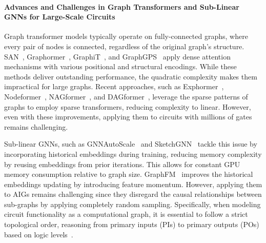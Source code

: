 \paragraph{Advances and Challenges in Graph Transformers and Sub-Linear GNNs for Large-Scale Circuits}
Graph transformer models typically operate on fully-connected graphs, where every pair of nodes is connected, regardless of the original graph's structure. SAN~\citep{SAN}, Graphormer~\citep{Graphormer}, GraphiT~\citep{GraphiT}, and GraphGPS~\citep{GraphGPS} apply dense attention mechanisms with various positional and structural encodings. While these methods deliver outstanding performance, the quadratic complexity makes them impractical for large graphs. Recent approaches, such as Exphormer~\citep{Exphormer}, Nodeformer~\citep{Nodeformer}, NAGformer~\citep{NAGphormer}, and DAGformer~\citep{DAGformer}, leverage the sparse patterns of graphs to employ sparse transformers, reducing complexity to linear. However, even with these improvements, applying them to circuits with millions of gates remains challenging.

Sub-linear GNNs, such as GNNAutoScale~\citep{GNNAutoScale} and SketchGNN~\citep{SketchGNN} tackle this issue by incorporating historical embeddings during training, reducing memory complexity by reusing embeddings from prior iterations. This allows for constant GPU memory consumption relative to graph size. GraphFM~\citep{GraphFM} improves the  historical embeddings updating by introducing feature momentum. However, applying them to AIGs remains challenging since they disregard the causal relationships between sub-graphs by applying completely random sampling. Specifically, when modeling circuit functionality as a computational graph, it is essential to follow a strict topological order, reasoning from primary inputs (PIs) to primary outputs (POs) based on logic levels~\citep{li2022deepgate}. 

\vspace{-10pt}

